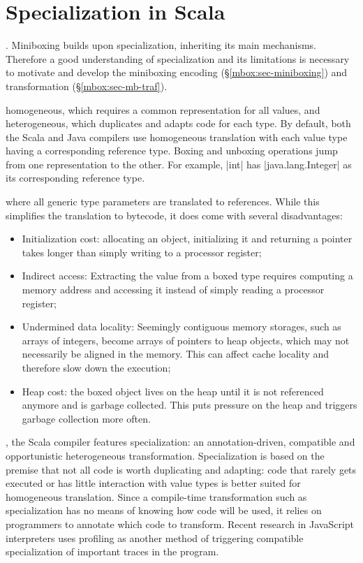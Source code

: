 \section{Specialization in Scala}
\label{mbox:sec-generics}

. Miniboxing builds upon specialization, inheriting its main mechanisms. Therefore a good understanding of specialization and its limitations is necessary to motivate and develop the miniboxing encoding (\S\ref{mbox:sec-miniboxing}) and transformation (\S\ref{mbox:sec-mb-traf}).

 homogeneous, which requires a common representation for all values, and heterogeneous, which duplicates and adapts code for each type. By default, both the Scala and Java compilers use homogeneous translation with each value type having a corresponding reference type. Boxing and unboxing operations jump from one representation to the other. For example, |int| has |java.lang.Integer| as its corresponding reference type.

 where all generic type parameters are translated to references. While this simplifies the translation to bytecode, it does come with several disadvantages:
\begin{itemize}
\item Initialization cost: allocating an object, initializing it and returning a pointer takes longer than simply writing to a processor register;
\item Indirect access: Extracting the value from a boxed type requires computing a memory address and accessing it instead of simply reading a processor register;
\item Undermined data locality: Seemingly contiguous memory storages, such as arrays of integers, become arrays of pointers to heap objects, which may not necessarily be aligned in the memory. This can affect cache locality and therefore slow down the execution;
\item Heap cost: the boxed object lives on the heap until it is not referenced anymore and is garbage collected. This puts pressure on the heap and triggers garbage collection more often.
\end{itemize}

, the Scala compiler features specialization: an annotation-driven, compatible and opportunistic heterogeneous transformation. Specialization is based on the premise that not all code is worth duplicating and adapting: code that rarely gets executed or has little interaction with value types is better suited for homogeneous translation. Since a compile-time transformation such as specialization has no means of knowing how code will be used, it relies on programmers to annotate which code to transform. Recent research in JavaScript interpreters \cite{tracemonkey, truffle} uses profiling as another method of triggering compatible specialization of important traces in the program.

